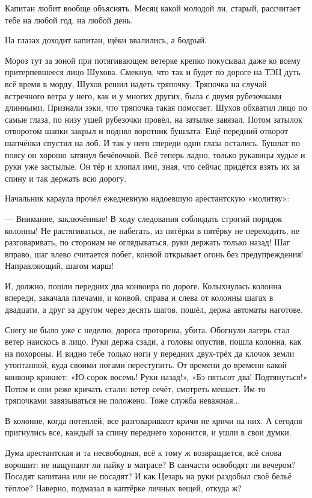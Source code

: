 Капитан любит вообще объяснять. Месяц какой \dash молодой ли, старый, \dash рассчитает тебе на любой
год, на любой день.

На глазах доходит капитан, щёки ввалились, \dash а бодрый.

Мороз тут за зоной при потягивающем ветерке крепко покусывал даже ко всему притерпевшееся
лицо Шухова. Смекнув, что так и будет по дороге на ТЭЦ дуть всё время в морду, Шухов решил
надеть тряпочку. Тряпочка на случай встречного ветра у него, как и у многих других, была с
двумя рубезочками длинными. Признали зэки, что тряпочка такая помогает. Шухов обхватил лицо
по самые глаза, по низу ушей рубезочки провёл, на затылке завязал. Потом затылок отворотом
шапки закрыл и поднял воротник бушлата. Ещё передний отворот шапчёнки спустил на лоб. И так у
него спереди одни глаза остались. Бушлат по поясу он хорошо затянул бечёвочкой. Всё теперь
ладно, только рукавицы худые и руки уже застылые. Он тёр и хлопал ими, зная, что сейчас
придётся взять их за спину и так держать всю дорогу.

Начальник караула прочёл ежедневную надоевшую арестантскую «молитву»:

--- Внимание, заключённые! В ходу следования соблюдать строгий порядок колонны! Не
растягиваться, не набегать, из пятёрки в пятёрку не переходить, не разговаривать, по
сторонам не оглядываться, руки держать только назад! Шаг вправо, шаг влево \dash считается
побег, конвой открывает огонь без предупреждения! Направляющий, шагом марш!

И, должно, пошли передних два конвоира по дороге. Колыхнулась колонна впереди, закачала
плечами, и конвой, \dash справа и слева от колонны шагах в двадцати, а друг за другом через десять
шагов, \dash пошёл, держа автоматы наготове.

Снегу не было уже с неделю, дорога проторена, убита. Обогнули лагерь \dash стал ветер наискось в
лицо. Руки держа сзади, а головы опустив, пошла колонна, как на похороны. И видно тебе только
ноги у передних двух-трёх да клочок земли утоптанной, куда своими ногами переступить. От
времени до времени какой конвоир крикнет: «Ю-сорок восемь! Руки назад!», «Бэ-пятьсот два!
Подтянуться!» Потом и они реже кричать стали: ветер сечёт, смотреть мешает. Им-то тряпочками
завязываться не положено. Тоже служба неважная...

В колонне, когда потеплей, все разговаривают \dash кричи не кричи на них. А сегодня пригнулись
все, каждый за спину переднего хоронится, и ушли в свои думки.

Дума арестантская \dash и та несвободная, всё к тому ж возвращается, всё снова ворошит: не
нащупают ли пайку в матрасе? В санчасти освободят ли вечером? Посадят капитана или не
посадят? И как Цезарь на руки раздобыл своё бельё тёплое? Наверно, подмазал в каптёрке личных
вещей, откуда ж?

